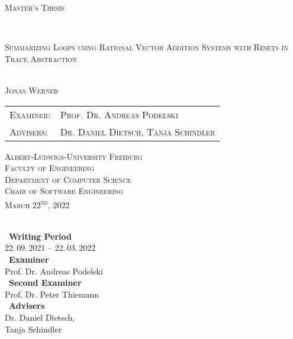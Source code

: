 \begin{titlepage}
	\begin{center}
		
		{\scshape\Large Master's Thesis\par}
		
		
		\HorizontalLine \\[0.4cm]
		{{\huge\scshape Summarizing Loops using Rational Vector Addition Systems with Resets in Trace Abstraction } \par}
		\HorizontalLine \\[1.5cm]
		
		
		{\Large \scshape Jonas Werner}\\[5cm]
		
		
		\begin{tabular}[scshape]{>{\normalsize}l >{\normalsize}l}
			\scshape Examiner: & \scshape Prof. Dr. Andreas Podelski\\[0.3cm]
			\scshape Advisers: & \scshape Dr. Daniel Dietsch, Tanja Schindler  \\[1.2cm]
		\end{tabular}
		\vfill  %
		
		\large { \scshape
			Albert-Ludwigs-University Freiburg\\
			Faculty of Engineering\\
			Department of Computer Science\\
			Chair of Software Engineering \\[1cm]
			
			March 22\textsuperscript{nd}, 2022\\
		}
	\end{center}
\end{titlepage}

\thispagestyle{empty}
\ \vfill \ \\  %
\
\textbf{Writing Period}            \smallskip{} \\
22.\,09.\,2021 -- 22.\,03.\,2022   \bigskip{} \\
\
\textbf{Examiner}                  \smallskip{} \\
Prof. Dr. Andreas Podelski                     \bigskip{} \\
\
\textbf{Second Examiner}                  \smallskip{} \\
Prof. Dr. Peter Thiemann        \bigskip{} \\
\
\textbf{Advisers}                  \smallskip{} \\
Dr. Daniel Dietsch, \\ Tanja Schindler
\pagebreak
